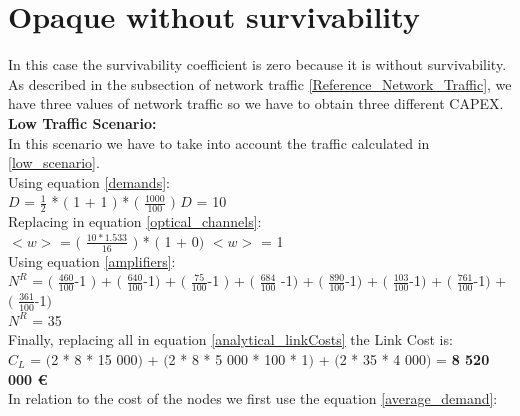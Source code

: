 \clearpage

\section{Opaque without survivability}\label{analytical_Opaque_Survivability}

In this case the survivability coefficient is zero because it is without survivability.\\
As described in the subsection of network traffic \ref{Reference_Network_Traffic}, we have three values of network traffic so we have to obtain three different CAPEX.\\

\textbf{Low Traffic Scenario:}\\

In this scenario we have to take into account the traffic calculated in \ref{low_scenario}.\\

Using equation \ref{demands}:\\

$D$ = $\frac{1}{2}$ * $($ 1 + 1 $)$ * $($ $\frac{1000}{100}$ $)$ \qquad \qquad $D$ = 10\\

Replacing in equation \ref{optical_channels}:\\

$<w>$ = $($ $\frac{10 * 1.533}{16}$ $)$ * $($ 1 + 0$)$ \qquad \qquad $<w>$ = 1\\

Using equation \ref{amplifiers}:\\

$N^R$ = $($ $\frac{460}{100}$-1 $)$ + $($ $\frac{640}{100}$-1$)$ + $($ $\frac{75}{100}$-1 $)$ + $($ $\frac{684}{100}$ -1$)$ + $($ $\frac{890}{100}$-1$)$ + $($ $\frac{103}{100}$-1$)$ + $($ $\frac{761}{100}$-1$)$ + $($ $\frac{361}{100}$-1$)$\\

$N^R$ = 35\\

Finally, replacing all in equation \ref{analytical_linkCosts} the Link Cost is:\\

$C_L$ = $($2 * 8 * 15 000$)$ + $($2 * 8 * 5 000 * 100 * 1$)$ + $($2 * 35 * 4 000$)$ = \textbf{8 520 000 \euro}\\

In relation to the cost of the nodes we first use the equation \ref{average_demand}:\\

